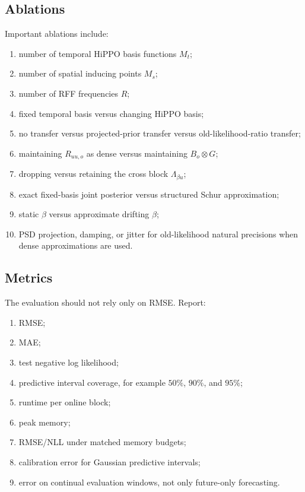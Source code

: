 \documentclass[12pt]{article}
\begin{document}
\subsection{Ablations}

Important ablations include:
\begin{enumerate}[label=(\arabic*)]
    \item number of temporal HiPPO basis functions $M_t$;
    \item number of spatial inducing points $M_s$;
    \item number of RFF frequencies $R$;
    \item fixed temporal basis versus changing HiPPO basis;
    \item no transfer versus projected-prior transfer versus old-likelihood-ratio transfer;
    \item maintaining $R_{uu,o}$ as dense versus maintaining $B_o\otimes G$;
    \item dropping versus retaining the cross block $\Lambda_{\beta u}$;
    \item exact fixed-basis joint posterior versus structured Schur approximation;
    \item static $\beta$ versus approximate drifting $\beta$;
    \item PSD projection, damping, or jitter for old-likelihood natural precisions when
    dense approximations are used.
\end{enumerate}

\subsection{Metrics}

The evaluation should not rely only on RMSE. Report:
\begin{enumerate}[label=(\arabic*)]
    \item RMSE;
    \item MAE;
    \item test negative log likelihood;
    \item predictive interval coverage, for example $50\%$, $90\%$, and $95\%$;
    \item runtime per online block;
    \item peak memory;
    \item RMSE/NLL under matched memory budgets;
    \item calibration error for Gaussian predictive intervals;
    \item error on continual evaluation windows, not only future-only forecasting.
\end{enumerate}
\end{document}
